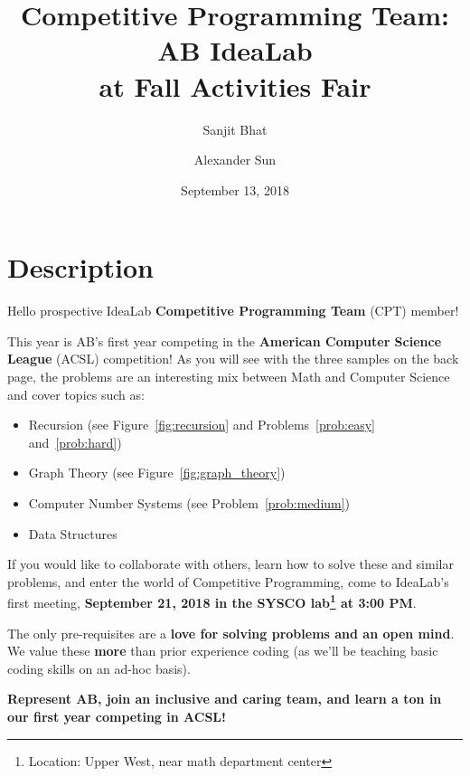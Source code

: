 \documentclass[12pt]{article}
\title{Competitive Programming Team: AB IdeaLab\\ at Fall Activities Fair}
\author{Sanjit Bhat \and Alexander Sun}
\date{September 13, 2018}
\begin{document}
\maketitle

\section{Description}
Hello prospective IdeaLab \textbf{Competitive Programming Team} (CPT) member!

This year is AB's first year competing in the \textbf{American Computer Science League} (ACSL) competition!
As you will see with the three samples on the back page, the
problems are an interesting mix between Math and Computer Science and cover topics such as:

\begin{itemize}
\item Recursion (see Figure~\ref{fig:recursion} and Problems~\ref{prob:easy} and~\ref{prob:hard})
\item Graph Theory (see Figure~\ref{fig:graph_theory})
\item Computer Number Systems (see Problem~\ref{prob:medium})
\item Data Structures
\end{itemize}

If you would like to collaborate with others, learn how to solve these and similar problems,
and enter the world of Competitive Programming, come to IdeaLab's first meeting,
\textbf{September 21, 2018 in the SYSCO lab\footnote{Location: Upper West, near math department center} at 3:00 PM}.

The only pre-requisites are a \textbf{love for solving problems and an open mind}.
We value these \textbf{more} than prior experience coding
(as we'll be teaching basic coding skills on an ad-hoc basis).

\textbf{Represent AB, join an inclusive and caring team, and learn a ton in our first year competing in ACSL!}
\end{document}
